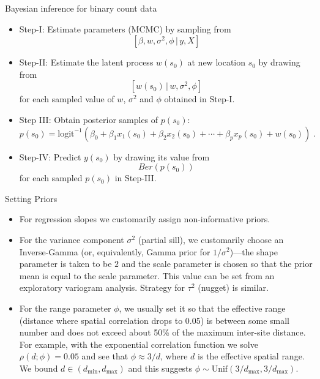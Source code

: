 \documentclass[xcolor=pdftex,dvipsnames,table,numbers,hyperref={pdfpagelabels=false},compress]{beamer}
\newcommand{\given}{\,|\,}
\begin{document}
\begin{frame}{Bayesian inference for binary count data}
 
 \begin{itemize}
  \item Step-I: Estimate parameters (MCMC) by sampling from
  \[
   [\beta, w, \sigma^2, \phi \given y, X]
  \]

  \item Step-II: Estimate the latent process $w(s_0)$ at new location $s_0$ by drawing from
  \[
   [w(s_0) \given w, \sigma^2, \phi] 
  \]
  for each sampled value of $w$, $\sigma^2$ and $\phi$ obtained in Step-I.
  
  \item Step III: Obtain posterior samples of $p(s_0)$:
  {\small
  \[
   p(s_0) = \mbox{logit}^{-1}\left(\beta_0 + \beta_1 x_{1}(s_0) + \beta_2 x_{2}(s_0) + \cdots + \beta_p x_{p}(s_0) + w(s_0)\right)\;.
  \]
}
  \item Step-IV: Predict $y(s_0)$ by drawing its value from
  \[
   Ber(p(s_0))
  \]
  for each sampled $p(s_0)$ in Step-III.
  
 \end{itemize}
 
\end{frame}

\begin{frame}{Setting Priors}

{\small
\begin{itemize}
 \item For regression slopes we customarily assign non-informative priors.
 
 \item For the variance component $\sigma^2$ (partial sill), we customarily choose an Inverse-Gamma (or, equivalently, Gamma prior for $1/\sigma^2$)---the shape parameter is taken to be $2$ and the scale parameter is chosen so that the prior mean is equal to the scale parameter. This value can be set from an exploratory variogram analysis. Strategy for $\tau^2$ (nugget) is similar.
 
 \item For the range parameter $\phi$, we usually set it so that the effective range (distance where spatial correlation drops to 0.05) is between some small number and does not exceed about 50\% of the maximum inter-site distance. For example, with the exponential correlation function we solve $\rho(d;\phi) = 0.05$ and see that $\phi \approx 3/d$, where $d$ is the effective spatial range. We bound $d \in (d_{\min}, d_{\max})$ and this suggests $\phi \sim \mbox{Unif}(3/d_{\max}, 3/d_{\max})$. 
\end{itemize}
}

\end{frame}
\end{document}
